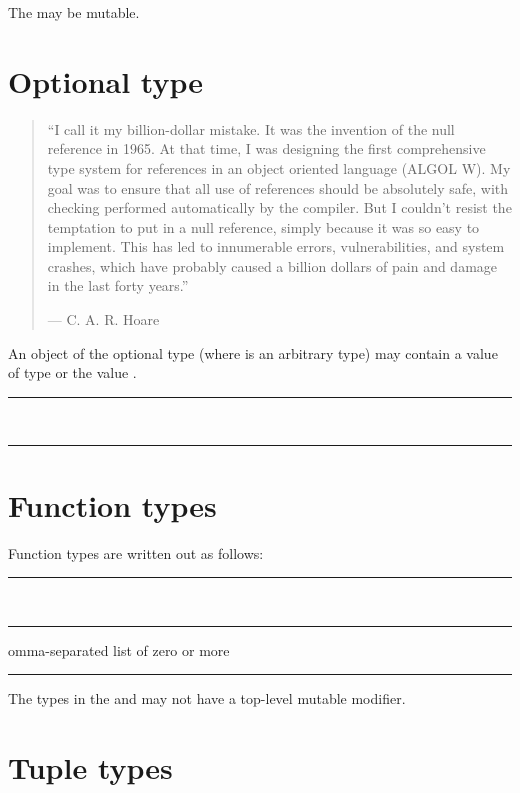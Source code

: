 The  may be mutable.

\section{Optional type}

\begin{quote}
``I call it my billion-dollar mistake. It was the invention of the null
reference in 1965. At that time, I was designing the first comprehensive type
system for references in an object oriented language (ALGOL W). My goal was to
ensure that all use of references should be absolutely safe, with checking
performed automatically by the compiler. But I couldn't resist the temptation to
put in a null reference, simply because it was so easy to implement. This has
led to innumerable errors, vulnerabilities, and system crashes, which have
probably caused a billion dollars of pain and damage in the last forty years.''

--- C. A. R. Hoare
\end{quote}

An object of the optional type  (where  is an arbitrary type)
may contain a value of type  or the value .

\begin{grammar}
\rule{optional-type}  \\
\rule{wrapped-type} 
\end{grammar}

\section{Function types}

Function types are written out as follows:

\begin{grammar}
\rule{function-type} \code{(}  \code{)} \code{->} \\
\rule{parameter-type-list} comma-separated list of zero or more \\
\rule{return-type} 
\end{grammar}

The types in the  and 
may not have a top-level mutable modifier.

\section{Tuple types}

